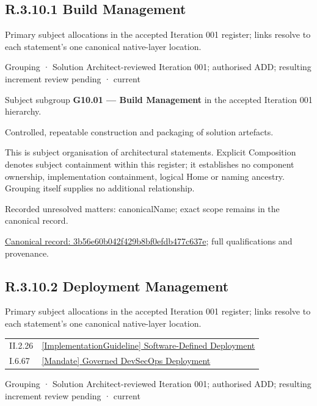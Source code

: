 \subsection*{R.3.10.1 Build Management}
\label{navigation:R.3.10.1}

Primary subject allocations in the accepted Iteration 001 register; links resolve to each statement’s one canonical native-layer location.\par
\label{element:3b56e60b042f429b8bf0efdb477c637e}
{\small Grouping · Solution Architect-reviewed Iteration 001; authorised ADD; resulting increment review pending · current}\par

Subject subgroup \textbf{G10.01 — Build Management} in the accepted Iteration 001 hierarchy.



Controlled, repeatable construction and packaging of solution artefacts.



This is subject organisation of architectural statements. Explicit Composition denotes subject containment within this register; it establishes no component ownership, implementation containment, logical Home or naming ancestry. Grouping itself supplies no additional relationship.


{\small Recorded unresolved matters: canonicalName; exact scope remains in the canonical record.}\par
{\footnotesize \href{../../../../continuum/grouping/3b56e60b042f429b8bf0efdb477c637e.md}{Canonical record: 3b56e60b042f429b8bf0efdb477c637e}; full qualifications and provenance.}\par
\subsection*{R.3.10.2 Deployment Management}
\label{navigation:R.3.10.2}

Primary subject allocations in the accepted Iteration 001 register; links resolve to each statement’s one canonical native-layer location.\par
\begin{longtable}{p{.22\linewidth}p{.73\linewidth}}
II.2.26 & \hyperref[element:1ad8342e9ffd43138b27be348e861a77]{[ImplementationGuideline] Software-Defined Deployment} \\
I.6.67 & \hyperref[element:54eb7e671c094ebcbb5503af36c7892d]{[Mandate] Governed DevSecOps Deployment} \\
\end{longtable}
\label{element:36264352a7f745109deaac2025877690}
{\small Grouping · Solution Architect-reviewed Iteration 001; authorised ADD; resulting increment review pending · current}\par

